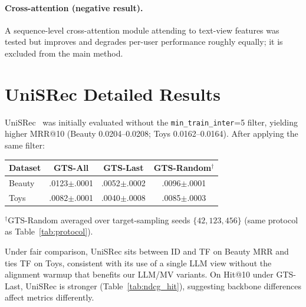 \documentclass[sigconf,natbib=true,anonymous]{acmart}
\begin{document}
\paragraph{Cross-attention (negative result).}
\label{app:cross}
A sequence-level cross-attention module attending to text-view features was tested but improves and degrades per-user performance roughly equally; it is excluded from the main method.

\section{UniSRec Detailed Results}
\label{app:unisrec}

UniSRec~\cite{hou2022unisrec} was initially evaluated without the \texttt{min\_train\_inter}=5 filter, yielding higher MRR@10 (Beauty 0.0204--0.0208; Toys 0.0162--0.0164).
After applying the same filter:

\begin{table}[h]
\centering
\small
\begin{tabular}{@{}lccc@{}}
\toprule
Dataset & GTS-All & GTS-Last & GTS-Random$^\dagger$ \\
\midrule
Beauty & .0123$\pm$.0001 & .0052$\pm$.0002 & .0096$\pm$.0001 \\
Toys   & .0082$\pm$.0001 & .0040$\pm$.0008 & .0085$\pm$.0003 \\
\bottomrule
\end{tabular}
\end{table}

\noindent$^\dagger$GTS-Random averaged over target-sampling seeds $\{42,123,456\}$ (same protocol as Table~\ref{tab:protocol}).

Under fair comparison, UniSRec sits between ID and TF on Beauty MRR and ties TF on Toys, consistent with its use of a single LLM view without the alignment warmup that benefits our LLM/MV variants.
On Hit@10 under GTS-Last, UniSRec is stronger (Table~\ref{tab:ndcg_hit}), suggesting backbone differences affect metrics differently.



\end{document}
